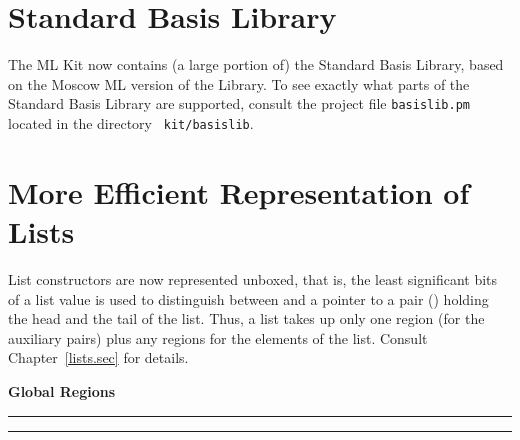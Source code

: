 \documentclass[12pt]{book}
\begin{document}
\section{Standard Basis Library}
The ML Kit now contains (a large portion of) the Standard Basis
Library, based on the Moscow ML version of the Library. To
see exactly what parts of the Standard Basis Library are supported, consult the
project file {\tt basislib.pm} located in the directory {\tt
  kit/basislib}. 
\section{More Efficient Representation of Lists}
 List constructors are now represented unboxed, that is,
the least significant bits of a list value is used to distinguish
between  and a pointer to a pair (\boxml{::}) holding the
head and the tail of the list. Thus, a list takes up only one region
(for the auxiliary pairs) plus any regions for the elements of the
list. Consult Chapter~\ref{lists.sec} for details.



\printindex
\begin{center}
\bf Global Regions
\end{center}
\smallskip

\hrule
{}
\hrule
\bigskip
\end{document}

